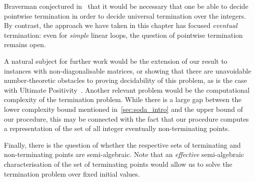 Braverman conjectured in~\cite{Bra06} that it would be necessary that one be able to decide pointwise termination in order to decide universal termination over the integers. By contrast, the approach we have taken in this chapter has focused \emph{eventual} termination: even for \emph{simple} linear loops, the question of pointwise termination remains open.

A natural subject for further work would be the extension of our result to instances with non-diagonalisable matrices, or showing that there are unavoidable number-theoretic obstacles to proving decidability of this problem, as is the case with Ultimate Positivity~\cite{OW14:SODA}.
Another relevant problem would be the computational complexity of the termination problem.  While there is a large gap between the \coNP{} lower complexity bound mentioned in~\cref{sec:soda_intro} and the \EXPSPACE{} upper bound of our procedure, this may be connected with the fact that our procedure computes a representation of the set of all integer eventually non-terminating points.

Finally, there is the question of whether the respective sets of terminating and non-terminating points are semi-algebraic.  Note that an \emph{effective} semi-algebraic characterisation of the set of terminating points would allow us to solve the termination problem over fixed initial values.


